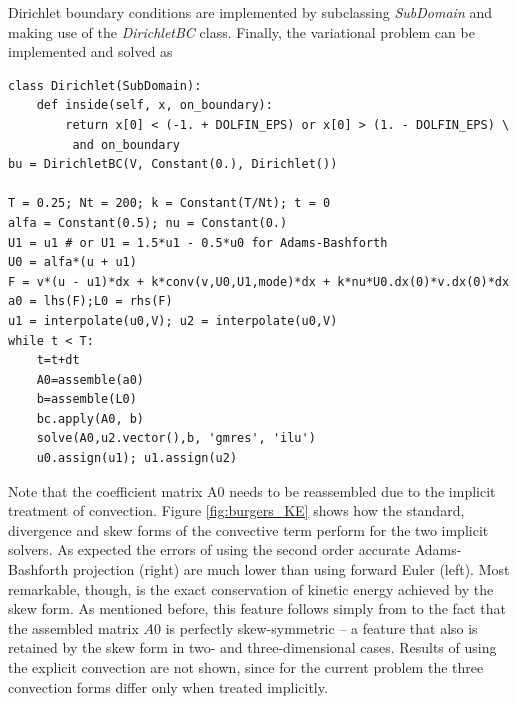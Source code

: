 Dirichlet boundary conditions are implemented by subclassing \emph{SubDomain} and making use of the \emph{DirichletBC} class. Finally, the variational problem can be implemented and solved as
\begin{small}
\begin{verbatim}
class Dirichlet(SubDomain):
    def inside(self, x, on_boundary):
        return x[0] < (-1. + DOLFIN_EPS) or x[0] > (1. - DOLFIN_EPS) \
         and on_boundary
bu = DirichletBC(V, Constant(0.), Dirichlet())

T = 0.25; Nt = 200; k = Constant(T/Nt); t = 0
alfa = Constant(0.5); nu = Constant(0.)
U1 = u1 # or U1 = 1.5*u1 - 0.5*u0 for Adams-Bashforth
U0 = alfa*(u + u1)
F = v*(u - u1)*dx + k*conv(v,U0,U1,mode)*dx + k*nu*U0.dx(0)*v.dx(0)*dx
a0 = lhs(F);L0 = rhs(F)
u1 = interpolate(u0,V); u2 = interpolate(u0,V)
while t < T:
    t=t+dt
    A0=assemble(a0)
    b=assemble(L0)
    bc.apply(A0, b)
    solve(A0,u2.vector(),b, 'gmres', 'ilu')
    u0.assign(u1); u1.assign(u2)
\end{verbatim}
\end{small}
Note that the coefficient matrix A0 needs to be reassembled due to the implicit treatment of convection. Figure \ref{fig:burgers_KE} shows how the standard, divergence and skew forms of the convective term perform for the two implicit solvers. As expected the errors of using the second order accurate Adams-Bashforth projection (right) are much lower than using forward Euler (left). Most remarkable, though, is the exact conservation of kinetic energy achieved by the skew form. As mentioned before, this feature follows simply from to the fact that the assembled matrix $A0$ is perfectly skew-symmetric -- a feature that also is retained by the skew form in two- and three-dimensional cases. Results of using the explicit convection are not shown, since for the current problem the three convection forms differ only when treated implicitly.
